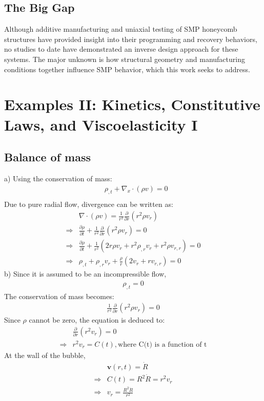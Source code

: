\documentclass{elsarticle}
\begin{document}
\subsection{The Big Gap}
Although additive manufacturing and uniaxial testing of SMP honeycomb structures have provided insight into their programming and recovery behaviors, no studies to date have demonstrated an inverse design approach for these systems. The major unknown is how structural geometry and manufacturing conditions together influence SMP behavior, which this work seeks to address.


 

\section{Examples II: Kinetics, Constitutive Laws, and Viscoelasticity I}
\subsection{Balance of mass}
a)
Using the conservation of mass:
\begin{align*}
    &\rho_{,t}+\nabla_x\cdot(\rho v)=0\\
\end{align*}
Due to pure radial flow, divergence can be written as:
\begin{align*}
    &\nabla\cdot(\rho v)=\frac{1}{r^2}\frac{\partial}{\partial r}(r^2\rho v_r)\\
    \Rightarrow&\frac{\partial\rho}{\partial t}+\frac{1}{r^2}\frac{\partial}{\partial r}(r^2\rho v_r)=0\\
    \Rightarrow&\frac{\partial\rho}{\partial t}+\frac{1}{r^2}(2r\rho v_r+r^2\rho_{,r}v_r+r^2\rho v_{r,r})=0\\
    \Rightarrow&\rho_{,t}+\rho_{,r}v_r+\frac{\rho}{r}(2v_r+r v_{r,r})=0
\end{align*}
b)
Since it is assumed to be an incompressible flow, 
\begin{align*}
    \rho_{,t}=0
\end{align*}
The conservation of mass becomes:
\begin{align*}
    \frac{1}{r^2}\frac{\partial}{\partial r}(r^2\rho v_r)=0
\end{align*}
Since $\rho$ cannot be zero, the equation is deduced to:
\begin{align*}
    &\frac{\partial}{\partial r}(r^2 v_r)=0\\
    \Rightarrow&r^2v_r=C(t), \text{where C(t) is a function of t}
\end{align*}
At the wall of the bubble, 
\begin{align*}
    &\bm{v}(r,t) = \dot{R}\\
    \Rightarrow &C(t)=R^2\dot{R}=r^2v_r\\
    \Rightarrow &v_r=\frac{R^2\dot{R}}{r^2}
\end{align*}
\end{document}
